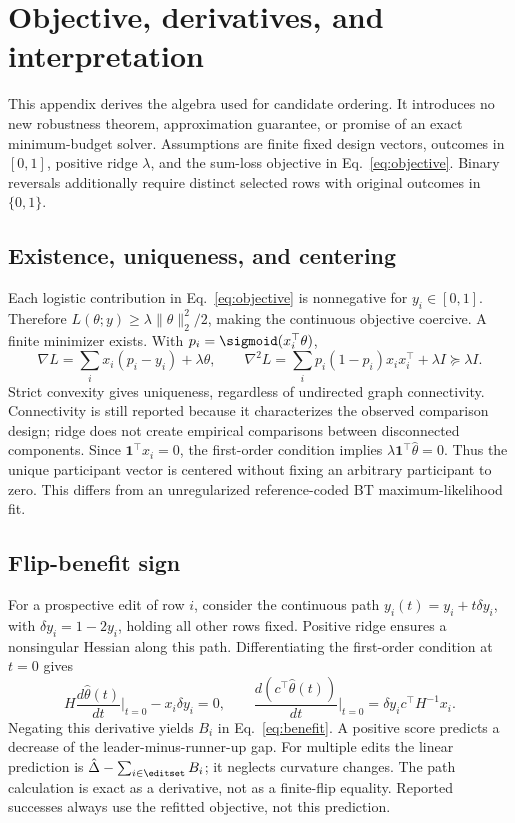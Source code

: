 \section{Objective, derivatives, and interpretation}
\label{app:derivation}
This appendix derives the algebra used for candidate ordering. It introduces no new robustness theorem, approximation guarantee, or promise of an exact minimum-budget solver. Assumptions are finite fixed design vectors, outcomes in $[0,1]$, positive ridge $\lambda$, and the sum-loss objective in Eq.~\eqref{eq:objective}. Binary reversals additionally require distinct selected rows with original outcomes in $\{0,1\}$.

\subsection{Existence, uniqueness, and centering}
Each logistic contribution in Eq.~\eqref{eq:objective} is nonnegative for $y_i\in[0,1]$. Therefore $L(\theta;y)\geq\lambda\|\theta\|_2^2/2$, making the continuous objective coercive. A finite minimizer exists. With $p_i=\sigmoid(x_i^\top\theta)$,
\begin{equation}
\nabla L=\sum_i x_i(p_i-y_i)+\lambda\theta,\qquad
\nabla^2 L=\sum_i p_i(1-p_i)x_i x_i^\top+\lambda I\succeq\lambda I.
\label{eq:gradient}
\end{equation}
Strict convexity gives uniqueness, regardless of undirected graph connectivity. Connectivity is still reported because it characterizes the observed comparison design; ridge does not create empirical comparisons between disconnected components. Since $\mathbf{1}^\top x_i=0$, the first-order condition implies $\lambda\mathbf{1}^\top\hat\theta=0$. Thus the unique participant vector is centered without fixing an arbitrary participant to zero. This differs from an unregularized reference-coded BT maximum-likelihood fit.

\subsection{Flip-benefit sign}
For a prospective edit of row $i$, consider the continuous path $y_i(t)=y_i+t\delta y_i$, with $\delta y_i=1-2y_i$, holding all other rows fixed. Positive ridge ensures a nonsingular Hessian along this path. Differentiating the first-order condition at $t=0$ gives
\begin{equation}
H\frac{d\hat\theta(t)}{dt}\bigg|_{t=0}-x_i\delta y_i=0,
\qquad
\frac{d(c^\top\hat\theta(t))}{dt}\bigg|_{t=0}
=\delta y_i c^\top H^{-1}x_i.
\label{eq:implicit}
\end{equation}
Negating this derivative yields $B_i$ in Eq.~\eqref{eq:benefit}. A positive score predicts a decrease of the leader-minus-runner-up gap. For multiple edits the linear prediction is $\hat\Delta-\sum_{i\in\editset}B_i$; it neglects curvature changes. The path calculation is exact as a derivative, not as a finite-flip equality. Reported successes always use the refitted objective, not this prediction.

